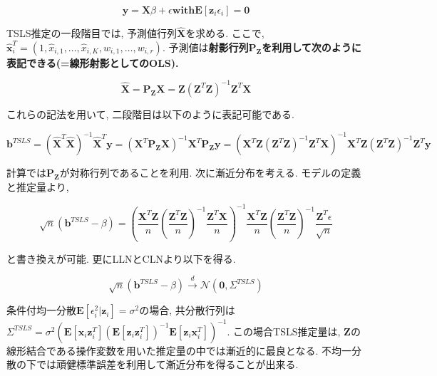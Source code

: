 \documentclass[paper=a4paper,fontsize=10pt]{jlreq}
\begin{document}
\begin{equation*}
  \mathbf{y} = \mathbf{X}\beta + \epsilon　\mathbf{with}　\mathbf{E}[\mathbf{z}_i\epsilon_i] = \mathbf{0}
\end{equation*}

TSLS推定の一段階目では, 予測値行列$\hat{\mathbf{X}}$を求める. ここで, $\hat{\mathbf{x}}_i^T = (1, \hat{x}_{i,1}, \dots, \hat{x}_{i,K}, w_{i,1}, \dots, w_{i,r})$. 予測値は\rmfamily\mcfamily\bfseries{射影行列}\mdseries $\mathbf{P_Z}$を利用して次のように表記できる(=線形射影としてのOLS). 

\begin{equation*}
  \hat{\mathbf{X}} = \mathbf{P_Z}{\mathbf{X}} = \mathbf{Z}(\mathbf{Z}^T\mathbf{Z})^{-1}\mathbf{Z}^T\mathbf{X}
\end{equation*}

これらの記法を用いて, 二段階目は以下のように表記可能である.

\begin{equation*}
  \mathbf{b}^{TSLS} = (\hat{\mathbf{X}}^T\hat{\mathbf{X}})^{-1}\hat{\mathbf{X}}^T\mathbf{y} = (\mathbf{X}^T\mathbf{P_Z}{\mathbf{X}})^{-1}\mathbf{X}^T\mathbf{P_Z}\mathbf{y} = (\mathbf{X}^T\mathbf{Z}(\mathbf{Z}^T\mathbf{Z})^{-1}\mathbf{Z}^T\mathbf{X})^{-1}\mathbf{X}^T\mathbf{Z}(\mathbf{Z}^T\mathbf{Z})^{-1}\mathbf{Z}^T\mathbf{y}
\end{equation*}

計算では$\mathbf{P_Z}$が対称行列であることを利用. 次に漸近分布を考える. モデルの定義と推定量より, 

\begin{equation*}
  \sqrt{n}(\mathbf{b}^{TSLS} - \beta) = (\frac{\mathbf{X}^T\mathbf{Z}}{n} (\frac{\mathbf{Z}^T\mathbf{Z}}{n})^{-1} \frac{\mathbf{Z}^T\mathbf{X}}{n})^{-1} \frac{\mathbf{X}^T\mathbf{Z}}{n} (\frac{\mathbf{Z}^T\mathbf{Z}}{n})^{-1} \frac{\mathbf{Z}^T\epsilon}{\sqrt{n}}
\end{equation*}

と書き換えが可能. 更にLLNとCLNより以下を得る.

\begin{equation*}
  \sqrt{n}(\mathbf{b}^{TSLS} - \beta) \overset{d}{\to} \mathcal{N}(\mathbf{0}, \Sigma^{TSLS})
\end{equation*}

条件付均一分散$\mathbf{E}[\epsilon_i^2|\mathbf{z}_i] = \sigma^2$の場合, 共分散行列は$\Sigma^{TSLS} = \sigma^2(\mathbf{E}[\mathbf{x}_i\mathbf{z}_i^T] (\mathbf{E}[\mathbf{z}_i\mathbf{z}_i^T])^{-1} \mathbf{E}[\mathbf{z}_i\mathbf{x}_i^T])^{-1}$. この場合TSLS推定量は, $\mathbf{Z}$の線形結合である操作変数を用いた推定量の中では漸近的に最良となる. 不均一分散の下では頑健標準誤差を利用して漸近分布を得ることが出来る.\\
\end{document}
